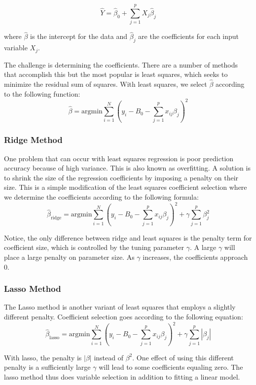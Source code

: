 \documentclass[12pt]{article}
\begin{document}
$$\hat{Y} = \hat{\beta}_0 + \sum_{j=1}^{p} X_j \hat{\beta}_j$$

where $\hat{\beta}$ is the intercept for the data and $\hat{\beta}_j$ are the coefficients for each input variable $X_j$. \cite[11]{springer}

The challenge is determining the coefficients. There are a number of methods that accomplish this but the most popular is least squares, which seeks to minimize the residual sum of squares. 
With least squares, we select $\hat{\beta}$ according to the following function:
$$\hat{\beta} = \text{argmin} \sum_{i=1}^{N} (y_i - B_0 - \sum_{j=1}^{p} x_{ij} \beta_j)^2$$
\cite[42]{springer}


\subsubsection{Ridge Method}
One problem that can occur with least squares regression is poor prediction accuracy because of high variance. \cite[55]{springer} This is also known as overfitting. A solution is to shrink the size of the regression coefficients by imposing a penalty on their size. This is a simple modification of the least squares coefficient selection where we determine the coefficients according to the following formula: 
$$\hat{\beta}_{\text{ridge}} = \text{argmin} \sum_{i=1}^{N} (y_i - B_0 - \sum_{j=1}^{p} x_{ij} \beta_j)^2 + \gamma \sum_{j=1}^{p}\beta_j^2$$
\cite[59]{springer}

Notice, the only difference between ridge and least squares is the penalty term for coefficient size, which is controlled by the tuning parameter $\gamma$. A large $\gamma$ will place a large penalty on parameter size. As $\gamma$ increases, the coefficients approach 0. 

\subsubsection{Lasso Method}
The Lasso method is another variant of least squares that employs a slightly different penalty. Coefficient selection goes according to the following equation:
$$\hat{\beta}_{\text{lasso}} = \text{argmin} \sum_{i=1}^{N} (y_i - B_0 - \sum_{j=1}^{p} x_{ij} \beta_j)^2 + \gamma \sum_{j=1}^{p}|\beta_j|$$

With lasso, the penalty is $|\beta|$ instead of $\beta^2$. One effect of using this different penalty is a sufficiently large $\gamma$ will lead to some coefficients equaling zero. The lasso method thus does variable selection in addition to fitting a linear model. \cite[64]{springer}
\end{document}
